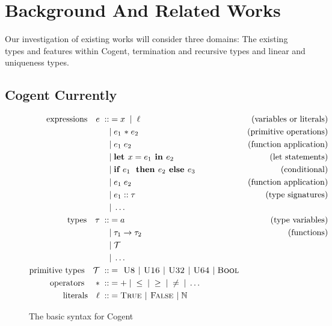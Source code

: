 \chapter{Background And Related Works}\label{ch:background}

Our investigation of existing works will consider three domains: The existing types and features
within Cogent, termination and recursive types and linear and uniqueness types.

\section{Cogent Currently}
\begin{figure}
    \centering

    \begin{align*}
    \text{expressions}\quad e\; ::&= x\;\; |\;\; \ell & \text{(variables or literals)} \\
                &|\; e_1 \text{ \textasteriskcentered }\; e_2 & \text{(primitive operations)} \\
                &|\; e_1\; e_2 & \text{(function application)} \\
                &|\; \textbf{let } x = e_1 \textbf{ in } e_2 & \text{(let statements)} \\
                &|\; \textbf{if } e_1\; \textbf{ then } e_2 \textbf{ else } e_3 & \text{(conditional)} \\
                &|\; e_1\; e_2 & \text{(function application)} \\
                &|\; e_1 :: \tau & \text{(type signatures)} \\
                &|\; \dots \\
        \text{types}\quad \tau\; ::&= a & \text{(type variables)} \\
              &|\; \tau_1 \rightarrow \tau_2 & \text{(functions)} \\
              &|\; \mathcal{T} \\
              &|\; \dots \\
        \text{primitive types}\quad \mathcal{T}\; ::&= \textsc{ U8 } | \textsc{ U16 } | \textsc{ U32 } | \textsc{ U64 } |\; \textsc{Bool} \\
        \text{operators \ \ \ \textasteriskcentered }\; ::&= +\; |\; \leq\; |\; \geq\; |\; \neq\; |\; \dots \\
        \text{literals}\quad \ell\; ::&= \textsc{True } | \textsc{ False } |\; \mathbb{N}  \\
    \end{align*}

    \caption{The basic syntax for Cogent~\citep{ICFPCogent}}
    \label{fig:cogentGrammar}
\end{figure}


